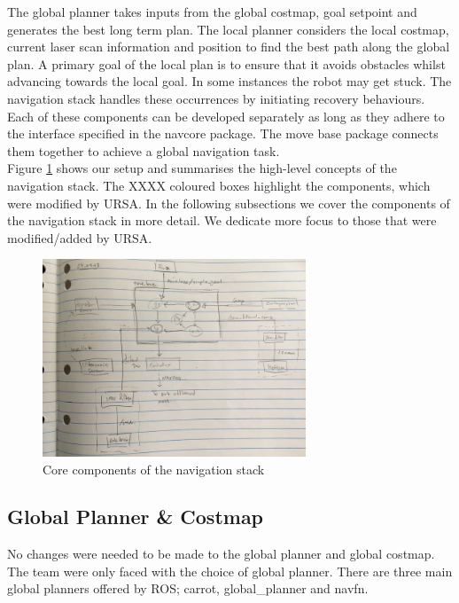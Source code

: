 \documentclass[capstone_report.tex]{subfiles}
\begin{document}
The global planner takes inputs from the global costmap, goal setpoint and generates the best long term plan.  The local planner considers the local costmap, current laser scan information and position to find the best path along the global plan.  A primary goal of the local plan is to ensure that it avoids obstacles whilst advancing towards the local goal.  In some instances the robot may get stuck.  The navigation stack handles these occurrences by initiating recovery behaviours.\\

Each of these components can be developed separately as long as they adhere to the interface specified in the navcore package.  The move base package connects them together to achieve a global navigation task.\\

Figure \ref{fig:nav_stack} shows our setup and summarises the high-level concepts of the navigation stack.  The XXXX coloured boxes highlight the components, which were modified by URSA.  In the following subsections we cover the components of the navigation stack in more detail.  We dedicate more focus to those that were modified/added by URSA.

\begin{figure}[H]
    \centering
    \includegraphics[width=0.7\textwidth]{imgs/nav_stack.jpg}
    \caption{Core components of the navigation stack\label{fig:nav_stack}}
\end{figure}

\subsection{Global Planner \& Costmap}

No changes were needed to be made to the global planner and global costmap.  The team were only faced with the choice of global planner.  There are three main global planners offered by ROS; carrot, global\_planner and navfn.\\
\end{document}
